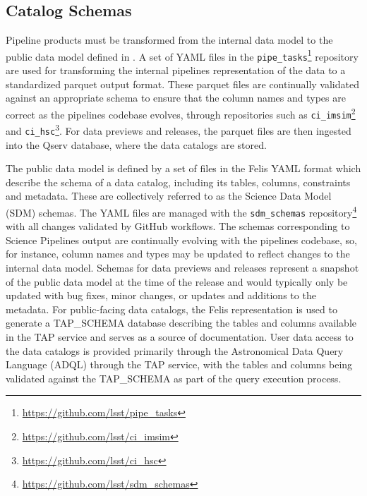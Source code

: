 \subsection{Catalog Schemas}
\label{sec:schemas}

Pipeline products must be transformed from the internal data model to the public data model defined in \citet{LSE-163}.
A set of YAML files in the \texttt{pipe\_tasks}\footnote{\url{https://github.com/lsst/pipe\_tasks}} repository are used for transforming the internal pipelines representation of the data to a standardized parquet output format.
These parquet files are continually validated against an appropriate schema to ensure that the column names and types are correct as the pipelines codebase evolves, through repositories such as \texttt{ci\_imsim}\footnote{\url{https://github.com/lsst/ci\_imsim}} and \texttt{ci\_hsc}\footnote{\url{https://github.com/lsst/ci\_hsc}}.
For data previews and releases, the parquet files are then ingested into the Qserv database, where the data catalogs are stored.

The public data model is defined by a set of files in the Felis \citep{2024arXiv241209721M} YAML format which describe the schema of a data catalog, including its tables, columns, constraints and metadata.
These are collectively referred to as the Science Data Model (SDM) schemas.
The YAML files are managed with the \texttt{sdm\_schemas} repository\footnote{\url{https://github.com/lsst/sdm\_schemas}} with all changes validated by GitHub workflows.
The schemas corresponding to Science Pipelines output are continually evolving with the pipelines codebase, so, for instance, column names and types may be updated to reflect changes to the internal data model.
Schemas for data previews and releases represent a snapshot of the public data model at the time of the release and would typically only be updated with bug fixes, minor changes, or updates and additions to the metadata.
For public-facing data catalogs, the Felis representation is used to generate a TAP\_SCHEMA database describing the tables and columns available in the TAP service \citep{2019ivoa.spec.0927D} and serves as a source of documentation.
User data access to the data catalogs is provided primarily through the Astronomical Data Query Language (ADQL) through the TAP service, with the tables and columns being validated against the TAP\_SCHEMA as part of the query execution process.
